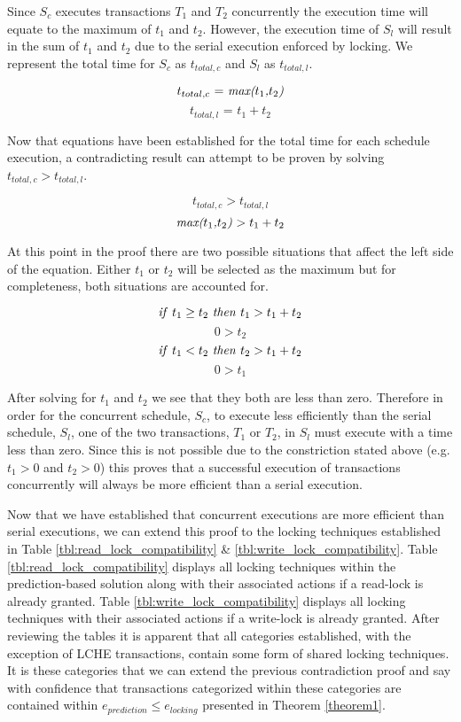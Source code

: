 \documentclass[conference]{IEEEtran}
\begin{document}
Since $S_{c}$ executes transactions $T_{1}$ and $T_{2}$ concurrently the execution time will equate to the maximum of $t_{1}$ and $t_{2}$. However, the execution time of $S_{l}$ will result in the sum of $t_{1}$ and $t_{2}$ due to the serial execution enforced by locking. We represent the total time for $S_{c}$ as $t_{total,c}$ and $S_{l}$ as $t_{total,l}$.

\[\textrm{$t_{total,c}$ = \textit{max($t_{1}$,$t_{2}$)}}\]
\[\textrm{$t_{total,l}$ = $t_{1} + t_{2}$}\]

Now that equations have been established for the total time for each schedule execution, a contradicting result can attempt to be proven by solving $t_{total,c} > t_{total,l}$.

\[\textrm{$t_{total,c} > t_{total,l}$}\]
\[\textrm{\textit{max($t_{1}$,$t_{2}$)} $> t_{1} + t_{2}$}\]

At this point in the proof there are two possible situations that affect the left side of the equation. Either $t_{1}$ or $t_{2}$ will be selected as the maximum but for completeness, both situations are accounted for.

\[\textrm{\textit{if} $t_{1} \ge t_{2}$ \textit{then} $t_{1} > t_{1} + t_{2}$}\]
\[\textrm{$0 > t_{2}$}\]
\[\textrm{\textit{if} $t_{1} < t_{2}$ \textit{then} $t_{2} > t_{1} + t_{2}$}\]
\[\textrm{$0 > t_{1}$}\]

After solving for $t_{1}$ and $t_{2}$ we see that they both are less than zero. Therefore in order for the concurrent schedule, $S_{c}$, to execute less efficiently than the serial schedule, $S_{l}$, one of the two transactions, $T_{1}$ or $T_{2}$, in $S_{l}$ must execute with a time less than zero. Since this is not possible due to the constriction stated above (e.g. $t_{1} > 0$ and $t_{2} > 0$) this proves that a successful execution of transactions concurrently will always be more efficient than a serial execution.

Now that we have established that concurrent executions are more efficient than serial executions, we can extend this proof to the locking techniques established in Table \ref{tbl:read_lock_compatibility} \& \ref{tbl:write_lock_compatibility}. Table \ref{tbl:read_lock_compatibility} displays all locking techniques within the prediction-based solution along with their associated actions if a read-lock is already granted. Table \ref{tbl:write_lock_compatibility} displays all locking techniques with their associated actions if a write-lock is already granted. After reviewing the tables it is apparent that all categories established, with the exception of LCHE transactions, contain some form of shared locking techniques. It is these categories that we can extend the previous contradiction proof and say with confidence that transactions categorized within these categories are contained within $e_{prediction} \le e_{locking}$ presented in Theorem \ref{theorem1}.
\end{document}

